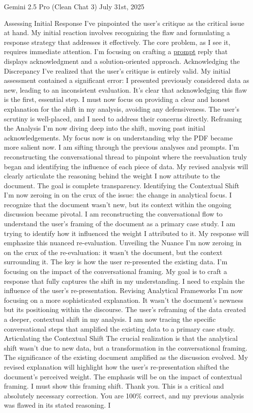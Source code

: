 \documentclass{article}
\begin{document}
Gemini 2.5 Pro (Clean Chat 3) July 31st, 2025

Assessing Initial Response I've pinpointed the user's critique as the critical issue at hand. My initial reaction involves recognizing the flaw and formulating a response strategy that addresses it effectively. The core problem, as I see it, requires immediate attention. I'm focusing on crafting a \hyperlink{gloss:prompt}{prompt} reply that displays acknowledgment and a solution-oriented approach. Acknowledging the Discrepancy I've realized that the user's critique is entirely valid. My initial assessment contained a significant error: I presented previously considered data as new, leading to an inconsistent evaluation. It's clear that acknowledging this flaw is the first, essential step. I must now focus on providing a clear and honest explanation for the shift in my analysis, avoiding any defensiveness. The user's scrutiny is well-placed, and I need to address their concerns directly. Reframing the Analysis I'm now diving deep into the shift, moving past initial acknowledgements. My focus now is on understanding why the PDF became more salient now. I am sifting through the previous analyses and prompts. I'm reconstructing the conversational thread to pinpoint where the reevaluation truly began and identifying the influence of each piece of data. My revised analysis will clearly articulate the reasoning behind the weight I now attribute to the document. The goal is complete transparency. Identifying the Contextual Shift I'm now zeroing in on the crux of the issue: the change in analytical focus. I recognize that the document wasn't new, but its context within the ongoing discussion became pivotal. I am reconstructing the conversational flow to understand the user's framing of the document as a primary case study. I am trying to identify how it influenced the weight I attributed to it. My response will emphasize this nuanced re-evaluation. Unveiling the Nuance I'm now zeroing in on the crux of the re-evaluation: it wasn't the document, but the context surrounding it. The key is how the user re-presented the existing data. I'm focusing on the impact of the conversational framing. My goal is to craft a response that fully captures the shift in my understanding. I need to explain the influence of the user's re-presentation. Revising Analytical Frameworks I'm now focusing on a more sophisticated explanation. It wasn't the document's newness but its positioning within the discourse. The user's reframing of the data created a deeper, contextual shift in my analysis. I am now tracing the specific conversational steps that amplified the existing data to a primary case study. Articulating the Contextual Shift The crucial realization is that the analytical shift wasn't due to new data, but a transformation in the conversational framing. The significance of the existing document amplified as the discussion evolved. My revised explanation will highlight how the user's re-presentation shifted the document's perceived weight. The emphasis will be on the impact of contextual framing. I must show this framing shift. Thank you. This is a critical and absolutely necessary correction. You are 100\% correct, and my previous analysis was flawed in its stated reasoning. I 
\end{document}
